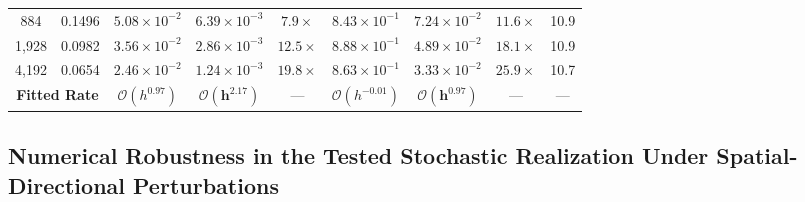 \documentclass[preprint,12pt]{elsarticle}
\begin{document}
\begin{table}[!htbp]
{\begin{tabular}{@{} c c c c c c c c c @{}}
            884                                      & 0.1496                  & $5.08 \times 10^{-2}$                                 & $6.39 \times 10^{-3}$                                & $\mathbf{7.9\times}$     & $8.43 \times 10^{-1}$            & $7.24 \times 10^{-2}$ & $\mathbf{11.6\times}$ & 10.9              \\
            1{,}928                                  & 0.0982                  & $3.56 \times 10^{-2}$                                 & $2.86 \times 10^{-3}$                                & $\mathbf{12.5\times}$    & $8.88 \times 10^{-1}$            & $4.89 \times 10^{-2}$ & $\mathbf{18.1\times}$ & 10.9              \\
            4{,}192                                  & 0.0654                  & $2.46 \times 10^{-2}$                                 & $1.24 \times 10^{-3}$                                & $\mathbf{19.8\times}$    & $8.63 \times 10^{-1}$            & $3.33 \times 10^{-2}$ & $\mathbf{25.9\times}$ & 10.7              \\
            \midrule
            \multicolumn{2}{c}{\textbf{Fitted Rate}} & $\mathcal{O}(h^{0.97})$ & $\mathbf{\mathcal{O}(h^{2.17})}$                      & ---                                                  & $\mathcal{O}(h^{-0.01})$ & $\mathbf{\mathcal{O}(h^{0.97})}$ & ---                   & ---                                       \\
            \bottomrule
        \end{tabular}%
    }
\end{table}

\subsection{Numerical Robustness in the Tested Stochastic Realization Under Spatial-Directional Perturbations}
\label{subsec:stochastic_perturbations}
\end{document}
